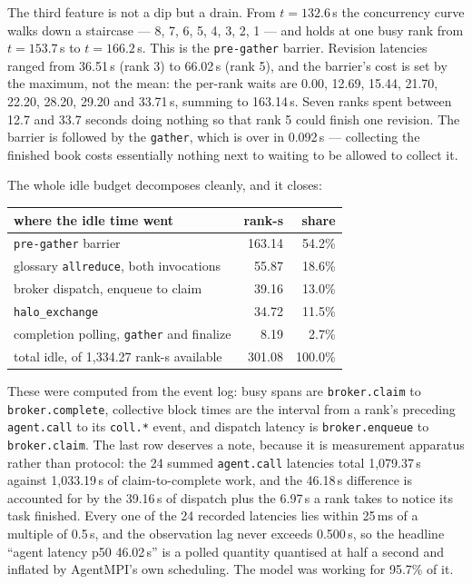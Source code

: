 \documentclass[11pt]{article}
\begin{document}
The third feature is not a dip but a drain. From $t=132.6$\,s the concurrency curve walks
down a staircase --- 8, 7, 6, 5, 4, 3, 2, 1 --- and holds at one busy rank from
$t=153.7$\,s to $t=166.2$\,s. This is the \texttt{pre-gather} barrier. Revision latencies
ranged from 36.51\,s (rank 3) to 66.02\,s (rank 5), and the barrier's cost is set by the
maximum, not the mean: the per-rank waits are 0.00, 12.69, 15.44, 21.70, 22.20, 28.20,
29.20 and 33.71\,s, summing to 163.14\,s. Seven ranks spent between 12.7 and 33.7 seconds
doing nothing so that rank 5 could finish one revision. The barrier is followed by the
\texttt{gather}, which is over in 0.092\,s --- collecting the finished book costs
essentially nothing next to waiting to be allowed to collect it.

The whole idle budget decomposes cleanly, and it closes:

\begin{center}
\begin{tabular}{@{}lrr@{}}
\toprule
  where the idle time went & rank-s & share \\
\midrule
  \texttt{pre-gather} barrier & 163.14 & 54.2\% \\
  glossary \texttt{allreduce}, both invocations & 55.87 & 18.6\% \\
  broker dispatch, enqueue to claim & 39.16 & 13.0\% \\
  \texttt{halo\_exchange} & 34.72 & 11.5\% \\
  completion polling, \texttt{gather} and finalize & 8.19 & 2.7\% \\
\midrule
  total idle, of 1{,}334.27 rank-s available & 301.08 & 100.0\% \\
\bottomrule
\end{tabular}
\end{center}

These were computed from the event log: busy spans are \texttt{broker.claim} to
\texttt{broker.complete}, collective block times are the interval from a rank's preceding
\texttt{agent.call} to its \texttt{coll.*} event, and dispatch latency is
\texttt{broker.enqueue} to \texttt{broker.claim}. The last row deserves a note, because
it is measurement apparatus rather than protocol: the 24 summed \texttt{agent.call}
latencies total 1{,}079.37\,s against 1{,}033.19\,s of claim-to-complete work, and the
46.18\,s difference is accounted for by the 39.16\,s of dispatch plus the 6.97\,s a rank
takes to notice its task finished. Every one of the 24 recorded latencies lies within 25\,ms of a
multiple of 0.5\,s, and the observation lag never exceeds 0.500\,s, so the headline
``agent latency p50 46.02\,s'' is a polled quantity quantised at half a second and
inflated by AgentMPI's own scheduling. The model was working for 95.7\% of it.
\end{document}
